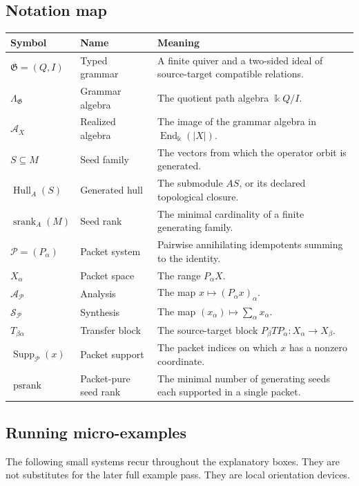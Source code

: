 \documentclass[11pt]{article}
\theoremstyle{definition}
\theoremstyle{remark}
\newcommand{\bbk}{\Bbbk}
\newcommand{\A}{\mathcal A}
\newcommand{\Pcal}{\mathcal P}
\newcommand{\Hull}{\operatorname{Hull}}
\newcommand{\srank}{\operatorname{srank}}
\newcommand{\psrank}{\operatorname{psrank}}
\newcommand{\End}{\operatorname{End}}
\newcommand{\Supp}{\operatorname{Supp}}
\begin{document}
\subsection*{Notation map}
\begin{center}
\begin{longtable}{@{}p{}p{}p{}@{}}
\toprule
\textbf{Symbol} & \textbf{Name} & \textbf{Meaning}\\
\midrule
\endhead
\(\mathfrak G=(Q,I)\) & Typed grammar & A finite quiver and a two-sided ideal of source-target compatible relations.\\
\(\Lambda_{\mathfrak G}\) & Grammar algebra & The quotient path algebra \(\bbk Q/I\).\\
\(\A_X\) & Realized algebra & The image of the grammar algebra in \(\End_{\bbk}(|X|)\).\\
\(S\subseteq M\) & Seed family & The vectors from which the operator orbit is generated.\\
\(\Hull_A(S)\) & Generated hull & The submodule \(AS\), or its declared topological closure.\\
\(\srank_A(M)\) & Seed rank & The minimal cardinality of a finite generating family.\\
\(\Pcal=(P_\alpha)\) & Packet system & Pairwise annihilating idempotents summing to the identity.\\
\(X_\alpha\) & Packet space & The range \(P_\alpha X\).\\
\(\mathcal A_{\Pcal}\) & Analysis & The map \(x\mapsto(P_\alpha x)_\alpha\).\\
\(\mathcal S_{\Pcal}\) & Synthesis & The map \((x_\alpha)\mapsto\sum_\alpha x_\alpha\).\\
\(T_{\beta\alpha}\) & Transfer block & The source-target block \(P_\beta TP_\alpha:X_\alpha\to X_\beta\).\\
\(\Supp_{\Pcal}(x)\) & Packet support & The packet indices on which \(x\) has a nonzero coordinate.\\
\(\psrank\) & Packet-pure seed rank & The minimal number of generating seeds each supported in a single packet.\\
\bottomrule
\end{longtable}
\end{center}

\subsection*{Running micro-examples}
The following small systems recur throughout the explanatory boxes.  They are not substitutes for the later full example pass.  They are local orientation devices.
\end{document}
